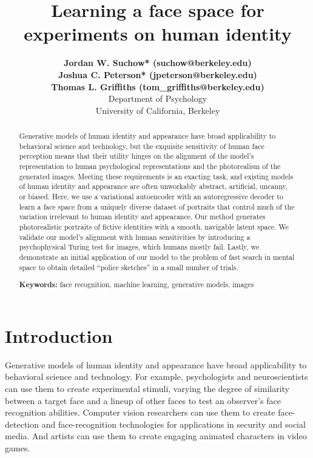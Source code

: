 \documentclass[10pt,letterpaper]{article}
\title{Learning a face space for experiments on human identity}
\author{
    {\bf Jordan W. Suchow* (suchow@berkeley.edu)} \\
    {\bf Joshua C. Peterson* (jpeterson@berkeley.edu)} \\
    {\bf Thomas L. Griffiths (tom\_griffiths@berkeley.edu)} \\
  Department of Psychology\\ University of California, Berkeley}
\begin{document}
\maketitle

\begin{abstract}

Generative models of human identity and appearance have broad applicability to behavioral science and technology, but the exquisite sensitivity of human face perception means that their utility hinges on the alignment of the model's representation to human psychological representations and the photorealism of the generated images. Meeting these requirements is an exacting task, and existing models of human identity and appearance are often unworkably abstract, artificial, uncanny, or biased. Here, we use a variational autoencoder with an autoregressive decoder to learn a face space from a uniquely diverse dataset of portraits that control much of the variation irrelevant to human identity and appearance. Our method generates photorealistic portraits of fictive identities with a smooth, navigable latent space. We validate our model's alignment with human sensitivities by introducing a psychophysical Turing test for images, which humans mostly fail. Lastly, we demonstrate an initial application of our model to the problem of fast search in mental space to obtain detailed ``police sketches'' in a small number of trials.

\textbf{Keywords:} 
face recognition, machine learning, generative models, images
\end{abstract}

\let\thefootnote\relax{}

\section{Introduction}

Generative models of human identity and appearance have broad applicability to behavioral science and technology. For example, psychologists and neuroscientists can use them to create experimental stimuli, varying the degree of similarity between a target face and a lineup of other faces to test an observer's face recognition abilities. Computer vision researchers can use them to create face-detection and face-recognition technologies for applications in security and social media. And artists can use them to create engaging animated characters in video games.
\end{document}
